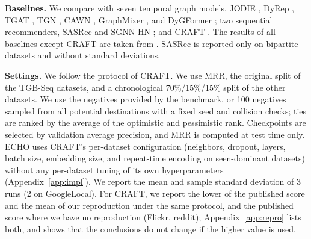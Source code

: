 \documentclass[twoside]{article}
\newcommand{\ours}{ECHO}
\begin{document}
\textbf{Baselines.} We compare with seven temporal graph models, JODIE \citep{kumar2019jodie}, DyRep \citep{trivedi2019dyrep}, TGAT \citep{xu2020tgat}, TGN \citep{rossi2020tgn}, CAWN \citep{wang2021cawn}, GraphMixer \citep{cong2023graphmixer}, and DyGFormer \citep{yu2023dygformer}; two sequential recommenders, SASRec \citep{kang2018sasrec} and SGNN-HN \citep{pan2020sgnnhn}; and CRAFT \citep{yi2025craft}. The results of all baselines except CRAFT are taken from \citet{yi2025craft}. SASRec is reported only on bipartite datasets and without standard deviations.

\textbf{Settings.} We follow the protocol of CRAFT. We use MRR, the original split of the TGB-Seq datasets, and a chronological 70\%/15\%/15\% split of the other datasets. We use the negatives provided by the benchmark, or 100 negatives sampled from all potential destinations with a fixed seed and collision checks; ties are ranked by the average of the optimistic and pessimistic rank. Checkpoints are selected by validation average precision, and MRR is computed at test time only. \ours{} uses CRAFT's per-dataset configuration (neighbors, dropout, layers, batch size, embedding size, and repeat-time encoding on seen-dominant datasets) without any per-dataset tuning of its own hyperparameters (Appendix~\ref{app:impl}). We report the mean and sample standard deviation of 3 runs (2 on GoogleLocal). For CRAFT, we report the lower of the published score and the mean of our reproduction under the same protocol, and the published score where we have no reproduction (Flickr, reddit); Appendix~\ref{app:repro} lists both, and shows that the conclusions do not change if the higher value is used.
\end{document}
